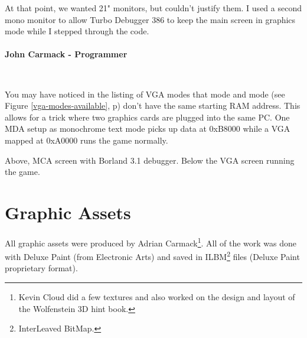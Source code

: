 \documentclass[book.tex]{subfiles}
\begin{document}
\begin{fancyquotes}
At that point, we wanted 21" monitors, but couldn't justify them.  I used a second mono monitor to allow Turbo Debugger 386 to keep the main screen in graphics mode while I stepped through the code.\\
 \\
\textbf{John Carmack - Programmer}
\end{fancyquotes}\\
\par
You may have noticed in the listing of VGA modes that mode  and mode  (see Figure \ref{vga-modes-available}, p\pageref{fig:vga_modes})  don't have the same starting RAM address. This allows for a trick where two graphics cards are plugged into the same PC. One MDA setup as monochrome text mode picks up data at 0xB8000 while a VGA mapped at 0xA0000 runs the game normally.
      \\
      \par
Above, MCA screen with Borland 3.1 debugger. Below the VGA screen running the game.\\




 
 
 




\section{Graphic Assets}

All graphic assets were produced by Adrian Carmack\footnote{Kevin Cloud did a few textures and also worked on the design and layout of the Wolfenstein 3D hint book.}. All of the work was done with Deluxe Paint (from Electronic Arts) and saved in ILBM\footnote{InterLeaved BitMap.} files (Deluxe Paint proprietary format). 
\end{document}
